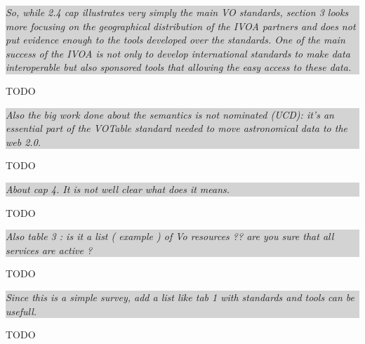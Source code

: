 \documentclass[a4paper]{article}
\newcommand{\quoting}[1]{
  
  
  \colorbox{lightgray}{
    \begin{minipage}{0.98\linewidth}
      \em #1
    \end{minipage}
  }
  
  
}
\begin{document}
\quoting{
So, while 2.4 cap illustrates very simply the main VO standards, section 3 looks
more focusing on the geographical distribution of the IVOA partners and does not
put evidence enough to the tools developed over the standards. One of the main
success of the IVOA is not only to develop international standards to make data
interoperable but also sponsored tools that allowing the easy access to these
data.
}

TODO

\quoting{
Also the big work done about the semantics is not nominated (UCD): it's an
essential part of the VOTable standard needed to move astronomical data to the
web 2.0.
}
TODO

\quoting{
About cap 4. It is not well clear what does it means. 
}

TODO

\quoting{
Also table 3 : is it a list ( example ) of Vo resources ??  are you sure that
all services are active ?
}

TODO

\quoting{
Since this is a simple survey, add a list like tab 1 with standards and tools
can be usefull.
}

TODO

\cite{Borne2013,HanischQuinn2003}



\end{document}
